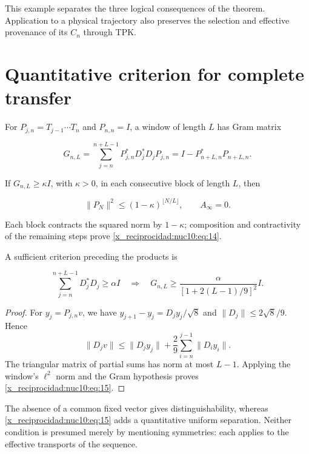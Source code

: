 This example separates the three logical consequences of the theorem.
Application to a physical trajectory also preserves the selection and
effective provenance of its \(C_n\) through TPK.

\section{Quantitative criterion for complete transfer}

For \(P_{j,n}=T_{j-1}\cdots T_n\) and \(P_{n,n}=I\), a window of length \(L\) has Gram matrix



\[
G_{n,L}=\sum_{j=n}^{n+L-1}P_{j,n}^*D_j^*D_jP_{j,n}
=I-P_{n+L,n}^*P_{n+L,n}.
\]



If \(G_{n,L}\geq\kappa I\), with \(\kappa>0\), in each consecutive block of length \(L\), then



\begin{equation}
\|P_N\|^2\le(1-\kappa)^{\lfloor N/L\rfloor},\qquad A_\infty=0.
\label{x_reciprocidad:nuc10:eq:14}
\end{equation}



Each block contracts the squared norm by \(1-\kappa\); composition and contractivity of the remaining steps prove \eqref{x_reciprocidad:nuc10:eq:14}.

A sufficient criterion preceding the products is



\begin{equation}
\sum_{j=n}^{n+L-1}D_j^*D_j\ge\alpha I
\quad\Longrightarrow\quad
G_{n,L}\ge\frac{\alpha}{[1+2(L-1)/9]^2}I.
\label{x_reciprocidad:nuc10:eq:15}
\end{equation}



\begin{proof}
For \(y_j=P_{j,n}v\), we have \(y_{j+1}-y_j=D_jy_j/\sqrt8\) and \(\|D_j\|\leq2\sqrt8/9\). Hence
\[
\|D_jv\|\leq\|D_jy_j\|+\frac29\sum_{i=n}^{j-1}\|D_iy_i\|.
\]
The triangular matrix of partial sums has norm at most \(L-1\). Applying the window's \(\ell^2\) norm and the Gram hypothesis proves \eqref{x_reciprocidad:nuc10:eq:15}.

\end{proof}

The absence of a common fixed vector gives distinguishability, whereas \eqref{x_reciprocidad:nuc10:eq:15} adds a quantitative uniform separation. Neither condition is presumed merely by mentioning symmetries: each applies to the effective transports of the sequence.

